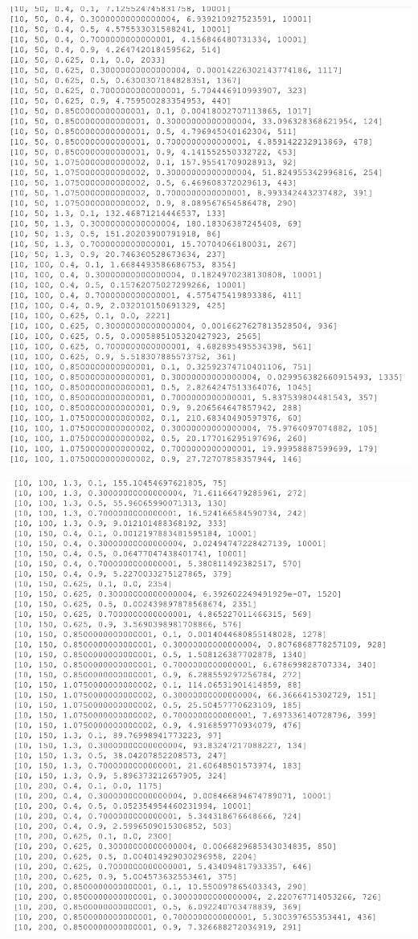 \documentclass[10pt,a4paper]{article}
\begin{document}
	\includegraphics[width= \textwidth, keepaspectratio]{img/11}
	
	\includegraphics[width= \textwidth, keepaspectratio]{img/12}
	
\end{document}
